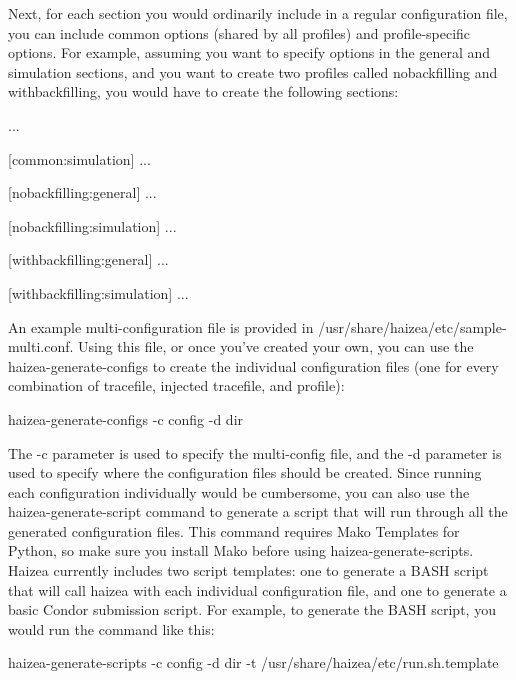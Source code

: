 Next, for each section you would ordinarily include in a regular configuration file, you can include common options (shared by all profiles) and profile-specific options. For example, assuming you want to specify options in the general and simulation sections, and you want to create two profiles called nobackfilling and withbackfilling, you would have to create the following sections:

\begin{wideshellverbatim}
...

[common:simulation]
...

[nobackfilling:general]
...

[nobackfilling:simulation]
...

[withbackfilling:general]
...

[withbackfilling:simulation]
...
\end{wideshellverbatim}

An example multi-configuration file is provided in /usr/share/haizea/etc/sample-multi.conf. Using this file, or once you've created your own, you can use the haizea-generate-configs to create the individual configuration files (one for every combination of tracefile, injected tracefile, and profile):

\begin{wideshellverbatim}
haizea-generate-configs -c config -d dir
\end{wideshellverbatim}

The -c parameter is used to specify the multi-config file, and the -d parameter is used to specify where the configuration files should be created. Since running each configuration individually would be cumbersome, you can also use the haizea-generate-script command to generate a script that will run through all the generated configuration files. This command requires Mako Templates for Python, so make sure you install Mako before using haizea-generate-scripts. Haizea currently includes two script templates: one to generate a BASH script that will call haizea with each individual configuration file, and one to generate a basic Condor submission script. For example, to generate the BASH script, you would run the command like this:

\begin{wideshellverbatim}
haizea-generate-scripts -c config -d dir -t /usr/share/haizea/etc/run.sh.template
\end{wideshellverbatim}
